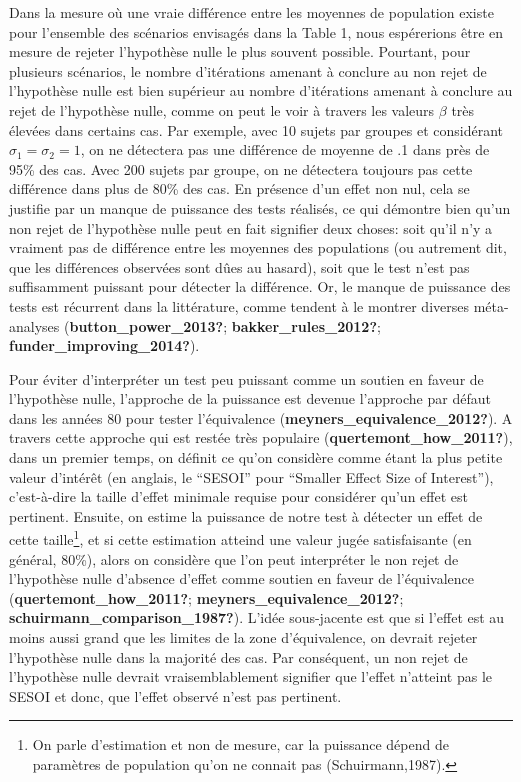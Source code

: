\documentclass[
  english,
  man]{apa6}
\begin{document}
Dans la mesure où une vraie différence entre les moyennes de population existe pour l'ensemble des scénarios envisagés dans la Table 1, nous espérerions être en mesure de rejeter l'hypothèse nulle le plus souvent possible. Pourtant, pour plusieurs scénarios, le nombre d'itérations amenant à conclure au non rejet de l'hypothèse nulle est bien supérieur au nombre d'itérations amenant à conclure au rejet de l'hypothèse nulle, comme on peut le voir à travers les valeurs \(\beta\) très élevées dans certains cas. Par exemple, avec 10 sujets par groupes et considérant \(\sigma_1=\sigma_2=1\), on ne détectera pas une différence de moyenne de .1 dans près de 95\% des cas. Avec 200 sujets par groupe, on ne détectera toujours pas cette différence dans plus de 80\% des cas. En présence d'un effet non nul, cela se justifie par un manque de puissance des tests réalisés, ce qui démontre bien qu'un non rejet de l'hypothèse nulle peut en fait signifier deux choses: soit qu'il n'y a vraiment pas de différence entre les moyennes des populations (ou autrement dit, que les différences observées sont dûes au hasard), soit que le test n'est pas suffisamment puissant pour détecter la différence. Or, le manque de puissance des tests est récurrent dans la littérature, comme tendent à le montrer diverses méta-analyses (\textbf{button\_power\_2013?}; \textbf{bakker\_rules\_2012?}; \textbf{funder\_improving\_2014?}).

Pour éviter d'interpréter un test peu puissant comme un soutien en faveur de l'hypothèse nulle, l'approche de la puissance est devenue l'approche par défaut dans les années 80 pour tester l'équivalence (\textbf{meyners\_equivalence\_2012?}). A travers cette approche qui est restée très populaire (\textbf{quertemont\_how\_2011?}), dans un premier temps, on définit ce qu'on considère comme étant la plus petite valeur d'intérêt (en anglais, le ``SESOI'' pour ``Smaller Effect Size of Interest''), c'est-à-dire la taille d'effet minimale requise pour considérer qu'un effet est pertinent. Ensuite, on estime la puissance de notre test à détecter un effet de cette taille\footnote{On parle d'estimation et non de mesure, car la puissance dépend de paramètres de population qu'on ne connait pas (Schuirmann,1987).}, et si cette estimation atteind une valeur jugée satisfaisante (en général, 80\%), alors on considère que l'on peut interpréter le non rejet de l'hypothèse nulle d'absence d'effet comme soutien en faveur de l'équivalence (\textbf{quertemont\_how\_2011?}; \textbf{meyners\_equivalence\_2012?}; \textbf{schuirmann\_comparison\_1987?}). L'idée sous-jacente est que si l'effet est au moins aussi grand que les limites de la zone d'équivalence, on devrait rejeter l'hypothèse nulle dans la majorité des cas. Par conséquent, un non rejet de l'hypothèse nulle devrait vraisemblablement signifier que l'effet n'atteint pas le SESOI et donc, que l'effet observé n'est pas pertinent.
\end{document}
